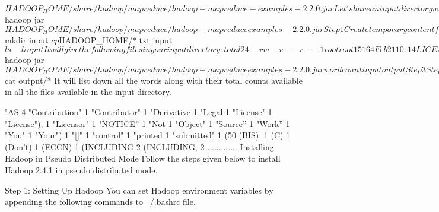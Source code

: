 $HADOOP_HOME/share/hadoop/mapreduce/hadoop-mapreduce-examples-2.2.0.jar 
Let's have an input directory where we will push a few files and our requirement is to count the total number of words in those files. To calculate the total number of words, we do not need to write our MapReduce, provided the .jar file contains the implementation for word count. You can try other examples using the same .jar file; just issue the following commands to check supported MapReduce functional programs by hadoop-mapreduce-examples-2.2.0.jar file.

$ hadoop jar $HADOOP_HOME/share/hadoop/mapreduce/hadoop-mapreduceexamples-2.2.0.jar 
Step 1
Create temporary content files in the input directory. You can create this input directory anywhere you would like to work.

$ mkdir input 
$ cp $HADOOP_HOME/*.txt input 
$ ls -l input 
It will give the following files in your input directory:

total 24 
-rw-r--r-- 1 root root 15164 Feb 21 10:14 LICENSE.txt 
-rw-r--r-- 1 root root   101 Feb 21 10:14 NOTICE.txt
-rw-r--r-- 1 root root  1366 Feb 21 10:14 README.txt 
These files have been copied from the Hadoop installation home directory. For your experiment, you can have different and large sets of files.

Step 2
Let's start the Hadoop process to count the total number of words in all the files available in the input directory, as follows:

$ hadoop jar $HADOOP_HOME/share/hadoop/mapreduce/hadoop-mapreduceexamples-2.2.0.jar  wordcount input output 
Step 3
Step-2 will do the required processing and save the output in output/part-r00000 file, which you can check by using:

$cat output/* 
It will list down all the words along with their total counts available in all the files available in the input directory.

"AS      4 
"Contribution" 1 
"Contributor" 1 
"Derivative 1
"Legal 1
"License"      1
"License");     1 
"Licensor"      1
"NOTICE”        1 
"Not      1 
"Object"        1 
"Source”        1 
"Work”    1 
"You"     1 
"Your")   1 
"[]"      1 
"control"       1 
"printed        1 
"submitted"     1 
(50%
(BIS),    1 
(C)       1 
(Don't)   1 
(ECCN)    1 
(INCLUDING      2 
(INCLUDING,     2 
.............
Installing Hadoop in Pseudo Distributed Mode
Follow the steps given below to install Hadoop 2.4.1 in pseudo distributed mode.

Step 1: Setting Up Hadoop
You can set Hadoop environment variables by appending the following commands to ~/.bashrc file.

